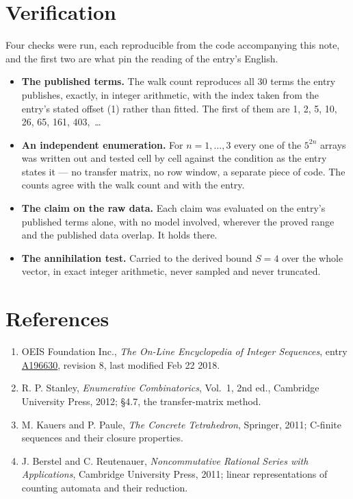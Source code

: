 \documentclass[11pt]{article}
\theoremstyle{definition}
\begin{document}
\section{Verification}

Four checks were run, each reproducible from the code accompanying this note, and the first two are what pin the reading of the entry's English.

\begin{itemize}

\item {\bfseries The published terms.} The walk count reproduces all 30 terms the entry publishes, exactly, in integer arithmetic, with the index taken from the entry's stated offset (1) rather than fitted. The first of them are 1, 2, 5, 10, 26, 65, 161, 403,~\dots

\item {\bfseries An independent enumeration.} For $n = 1,\dots,3$ every one of the $5^{2n}$ arrays was written out and tested cell by cell against the condition as the entry states it --- no transfer matrix, no row window, a separate piece of code. The counts agree with the walk count and with the entry.

\item {\bfseries The claim on the raw data.} Each claim was evaluated on the entry's published terms alone, with no model involved, wherever the proved range and the published data overlap. It holds there.

\item {\bfseries The annihilation test.} Carried to the derived bound $S = 4$ over the whole vector, in exact integer arithmetic, never sampled and never truncated.

\end{itemize}

\section{References}

\begin{enumerate}

\item OEIS Foundation Inc., \emph{The On-Line Encyclopedia of Integer Sequences}, entry \href{https://oeis.org/A196630}{A196630}, revision 8, last modified Feb 22 2018.

\item R. P. Stanley, \emph{Enumerative Combinatorics}, Vol.~1, 2nd ed., Cambridge University Press, 2012; \S4.7, the transfer-matrix method.

\item M. Kauers and P. Paule, \emph{The Concrete Tetrahedron}, Springer, 2011; C-finite sequences and their closure properties.

\item J. Berstel and C. Reutenauer, \emph{Noncommutative Rational Series with Applications}, Cambridge University Press, 2011; linear representations of counting automata and their reduction.

\end{enumerate}
\end{document}
